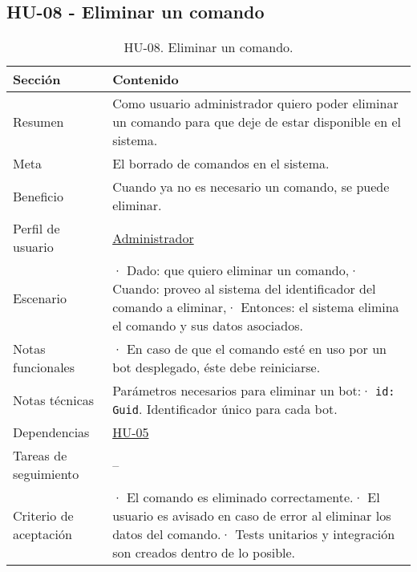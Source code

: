\subsection{HU-08 - Eliminar un comando}
\label{sec:hu08}

\begin{table}[H]
    \centering
    \def\arraystretch{1.25}
    \begin{adjustbox}{max width=\textwidth}
    \begin{tabularx}{\textwidth}{|l|L|}
    \hline
        \textbf{Sección} & \textbf{Contenido} \\ \hline
    \hline
        Resumen & Como usuario administrador quiero poder eliminar un comando para que deje de estar disponible en el sistema. \\ \hline
        Meta & El borrado de comandos en el sistema. \\ \hline
        Beneficio & Cuando ya no es necesario un comando, se puede eliminar. \\ \hline
        Perfil de usuario & \hyperref[sec:personaAdmin]{Administrador} \\ \hline
        Escenario & · Dado: que quiero eliminar un comando,\linebreak · Cuando: proveo al sistema del identificador del comando a eliminar,\linebreak · Entonces: el sistema elimina el comando y sus datos asociados. \\ \hline
        Notas funcionales & · En caso de que el comando esté en uso por un bot desplegado, éste debe reiniciarse. \\ \hline
        Notas técnicas & Parámetros necesarios para eliminar un bot:\linebreak · \verb|id: Guid|. Identificador único para cada bot. \\ \hline
        Dependencias & \hyperref[sec:hu05]{HU-05} \\ \hline
        Tareas de seguimiento & – \\ \hline
        Criterio de aceptación & · El comando es eliminado correctamente.\linebreak · El usuario es avisado en caso de error al eliminar los datos del comando.\linebreak · Tests unitarios y integración son creados dentro de lo posible. \\ \hline
    \end{tabularx}
    \end{adjustbox}
    \caption{HU-08. Eliminar un comando.}
\end{table}

